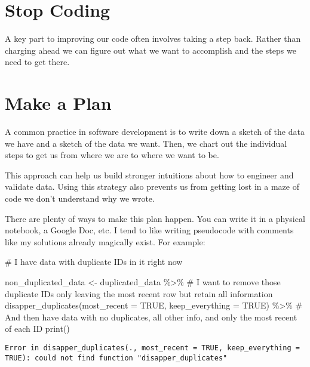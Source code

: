 \documentclass[
  letterpaper,
  DIV=11,
  numbers=noendperiod]{scrreprt}
\newenvironment{Shaded}{\begin{snugshade}}{\end{snugshade}}
\newcommand{\AttributeTok}[1]{\textcolor[rgb]{0.40,0.45,0.13}{#1}}
\newcommand{\CommentTok}[1]{\textcolor[rgb]{0.37,0.37,0.37}{#1}}
\newcommand{\ConstantTok}[1]{\textcolor[rgb]{0.56,0.35,0.01}{#1}}
\newcommand{\FunctionTok}[1]{\textcolor[rgb]{0.28,0.35,0.67}{#1}}
\newcommand{\NormalTok}[1]{\textcolor[rgb]{0.00,0.23,0.31}{#1}}
\newcommand{\OtherTok}[1]{\textcolor[rgb]{0.00,0.23,0.31}{#1}}
\newcommand{\SpecialCharTok}[1]{\textcolor[rgb]{0.37,0.37,0.37}{#1}}
\begin{document}
\hypertarget{stop-coding}{%
\section{Stop Coding}\label{stop-coding}}

A key part to improving our code often involves taking a step back.
Rather than charging ahead we can figure out what we want to accomplish
and the steps we need to get there.

\hypertarget{make-a-plan}{%
\section{Make a Plan}\label{make-a-plan}}

A common practice in software development is to write down a sketch of
the data we have and a sketch of the data we want. Then, we chart out
the individual steps to get us from where we are to where we want to be.

This approach can help us build stronger intuitions about how to
engineer and validate data. Using this strategy also prevents us from
getting lost in a maze of code we don't understand why we wrote.

There are plenty of ways to make this plan happen. You can write it in a
physical notebook, a Google Doc, etc. I tend to like writing pseudocode
with comments like my solutions already magically exist. For example:

\begin{Shaded}
\begin{Highlighting}[]
\CommentTok{\# I have data with duplicate IDs in it right now}

\NormalTok{non\_duplicated\_data }\OtherTok{\textless{}{-}}\NormalTok{ duplicated\_data }\SpecialCharTok{\%\textgreater{}\%} 
  \CommentTok{\# I want to remove those duplicate IDs only leaving the most recent row but retain all information}
  \FunctionTok{disapper\_duplicates}\NormalTok{(}\AttributeTok{most\_recent =} \ConstantTok{TRUE}\NormalTok{, }\AttributeTok{keep\_everything =} \ConstantTok{TRUE}\NormalTok{) }\SpecialCharTok{\%\textgreater{}\%} 
  \CommentTok{\# And then have data with no duplicates, all other info, and only the most recent of each ID}
  \FunctionTok{print}\NormalTok{()}
\end{Highlighting}
\end{Shaded}

\begin{verbatim}
Error in disapper_duplicates(., most_recent = TRUE, keep_everything = TRUE): could not find function "disapper_duplicates"
\end{verbatim}
\end{document}
